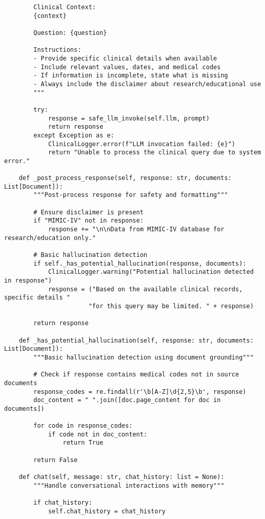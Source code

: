 \begin{verbatim}
        Clinical Context:
        {context}
        
        Question: {question}
        
        Instructions:
        - Provide specific clinical details when available
        - Include relevant values, dates, and medical codes
        - If information is incomplete, state what is missing
        - Always include the disclaimer about research/educational use
        """
        
        try:
            response = safe_llm_invoke(self.llm, prompt)
            return response
        except Exception as e:
            ClinicalLogger.error(f"LLM invocation failed: {e}")
            return "Unable to process the clinical query due to system error."
    
    def _post_process_response(self, response: str, documents: List[Document]):
        """Post-process response for safety and formatting"""
        
        # Ensure disclaimer is present
        if "MIMIC-IV" not in response:
            response += "\n\nData from MIMIC-IV database for research/education only."
        
        # Basic hallucination detection
        if self._has_potential_hallucination(response, documents):
            ClinicalLogger.warning("Potential hallucination detected in response")
            response = ("Based on the available clinical records, specific details "
                       "for this query may be limited. " + response)
        
        return response
    
    def _has_potential_hallucination(self, response: str, documents: List[Document]):
        """Basic hallucination detection using document grounding"""
        
        # Check if response contains medical codes not in source documents
        response_codes = re.findall(r'\b[A-Z]\d{2,5}\b', response)
        doc_content = " ".join([doc.page_content for doc in documents])
        
        for code in response_codes:
            if code not in doc_content:
                return True
        
        return False

    def chat(self, message: str, chat_history: list = None):
        """Handle conversational interactions with memory"""
        
        if chat_history:
            self.chat_history = chat_history
        

\end{verbatim}
